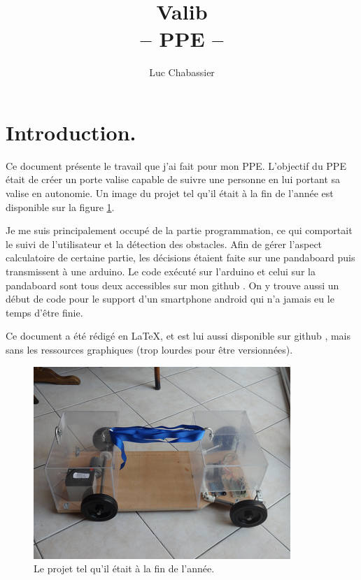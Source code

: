 \documentclass{article}
\title{Valib\\-- PPE --}
\author{Luc Chabassier}
\begin{document}
\maketitle
\tableofcontents

\section{Introduction.}
Ce document présente le travail que j'ai fait pour mon PPE. L'objectif du PPE était de créer un porte valise capable de suivre une personne en lui portant sa valise en autonomie. Un image du projet tel qu'il était à la fin de l'année est disponible sur la figure \ref{photo_final}.

Je me suis principalement occupé de la partie programmation, ce qui comportait le suivi de l'utilisateur et la détection des obstacles. Afin de gérer l'aspect calculatoire de certaine partie, les décisions étaient faite sur une pandaboard puis transmissent à une arduino. Le code exécuté sur l'arduino \cite{ppeardui} et celui sur la pandaboard \cite{ppefinal} sont tous deux accessibles sur mon github \cite{mygithub}. On y trouve aussi un début de code pour le support d'un smartphone android \cite{ppeandro} qui n'a jamais eu le temps d'être finie.

Ce document a été rédigé en \LaTeX, et est lui aussi disponible sur github \cite{ppedos}, mais sans les ressources graphiques (trop lourdes pour être versionnées).

\begin{figure}
    \begin{center}
        \includegraphics[width=0.7\linewidth]{rcs/photofinal.png}
    \end{center}
    \caption{Le projet tel qu'il était à la fin de l'année.}
    \label{photo_final}
\end{figure}
\end{document}
